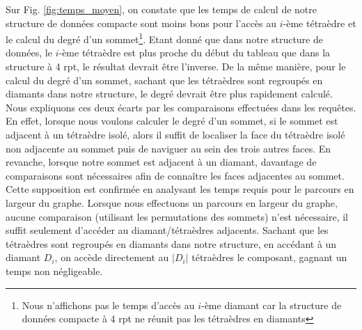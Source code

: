 Sur Fig. \ref{fig:temps_moyen}, on constate que les temps de calcul de notre structure de données compacte sont moins bons pour l'accès au $i$-ème tétraèdre et le calcul du degré d'un sommet\footnote{Nous n'affichons pas le temps d'accès au $i$-ème diamant car la structure de données compacte à 4 rpt ne réunit pas les tétraèdres en diamants}. Etant donné que dans notre structure de données, le $i$-ème tétraèdre est plus proche du début du tableau que dans la structure à 4 rpt, le résultat devrait être l'inverse. De la même manière, pour le calcul du degré d'un sommet, sachant que les tétraèdres sont regroupés en diamants dans notre structure, le degré devrait être plus rapidement calculé. Nous expliquons ces deux écarts par les comparaisons effectuées dans les requêtes. En effet, lorsque nous voulons calculer le degré d'un sommet, si le sommet est adjacent à un tétraèdre isolé, alors il suffit de localiser la face du tétraèdre isolé non adjacente au sommet puis de naviguer au sein des trois autres faces. En revanche, lorsque notre sommet est adjacent à un diamant, davantage de comparaisons sont nécessaires afin de connaître les faces adjacentes au sommet. Cette supposition est confirmée en analysant les temps requis pour le parcours en largeur du graphe. Lorsque nous effectuons un parcours en largeur du graphe, aucune comparaison (utilisant les permutations des sommets) n'est nécessaire, il suffit seulement d'accéder au diamant/tétraèdres adjacents. Sachant que les tétraèdres sont regroupés en diamants dans notre structure, en accédant à un diamant $D_i$, on accède directement au $|D_i|$ tétraèdres le composant, gagnant un temps non négligeable. 
